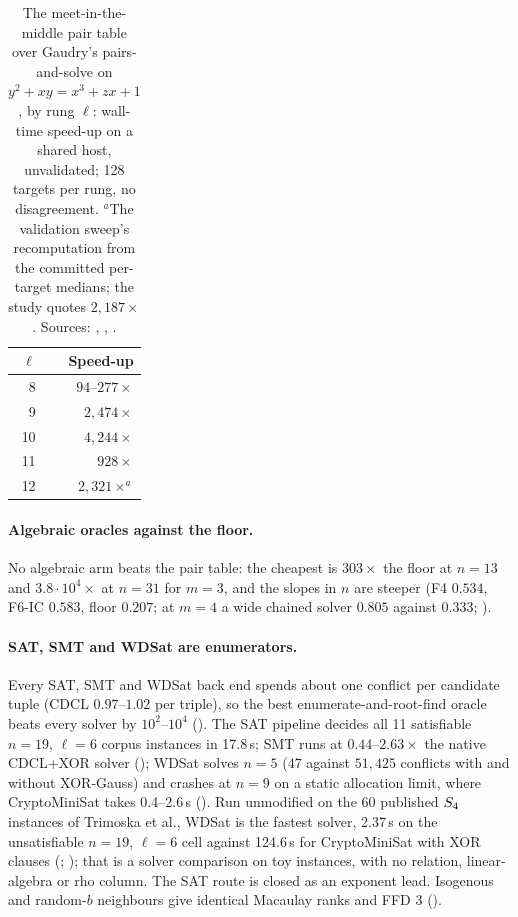 \begin{table}[t]
\centering\small
\begin{tabular}{@{}rr@{}}
\toprule
$\ell$ & Speed-up \\
\midrule
8 & $94$--$277\times$ \\
9 & $2{,}474\times$ \\
10 & $4{,}244\times$ \\
11 & $928\times$ \\
12 & $2{,}321\times^a$ \\
\bottomrule
\end{tabular}
\caption[]{The meet-in-the-middle pair table over Gaudry's pairs-and-solve
on $y^2+xy=x^3+zx+1$, by rung $\ell$: wall-time speed-up on a shared host,
unvalidated; 128 targets per rung, no disagreement. $^a$The validation
sweep's recomputation from the committed per-target medians; the study
quotes $2{,}187\times$. Sources:
,
,
.}
\label{tab:prog_binary-floor}
\end{table}

\paragraph{Algebraic oracles against the floor.} No algebraic arm beats the
pair table: the cheapest is $303\times$ the floor at $n=13$ and
$3.8\cdot10^4\times$ at $n=31$ for $m=3$, and the slopes in $n$ are steeper
(F4 $0.534$, F6-IC $0.583$, floor $0.207$; at $m=4$ a wide chained solver
$0.805$ against $0.333$; ).

\paragraph{SAT, SMT and WDSat are enumerators.} Every SAT, SMT and WDSat
back end spends about one conflict per candidate tuple (CDCL $0.97$--$1.02$
per triple), so the best enumerate-and-root-find oracle beats every solver
by $10^2$--$10^4$
().
The SAT pipeline decides all 11 satisfiable $n=19$, $\ell=6$ corpus
instances in 17.8\,s; SMT runs at $0.44$--$2.63\times$ the native CDCL+XOR
solver (); WDSat solves $n=5$
($47$ against $51{,}425$ conflicts with and without XOR-Gauss) and crashes
at $n=9$ on a static allocation limit, where CryptoMiniSat takes
0.4--2.6\,s (). Run unmodified on the 60
published $S_{4}$ instances of Trimoska et al., WDSat is the fastest solver,
2.37\,s on the unsatisfiable $n=19$, $\ell=6$ cell against 124.6\,s for
CryptoMiniSat with XOR clauses (;
\cite{icprogram2026}); that is a solver comparison on toy instances, with
no relation, linear-algebra or rho column. The SAT route is closed as an
exponent lead. Isogenous and random-$b$ neighbours give identical
Macaulay ranks and FFD 3 ().

